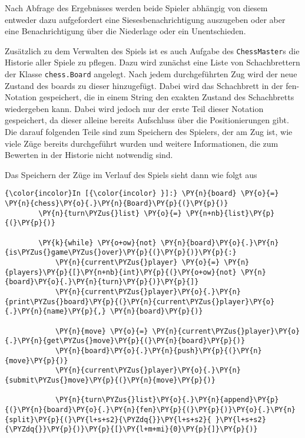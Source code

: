 Nach Abfrage des Ergebnisses werden beide Spieler abhängig von diesem
entweder dazu aufgefordert eine Siesesbenachrichtigung auszugeben oder
aber eine Benachrichtigung über die Niederlage oder ein Unentschieden.

Zusätzlich zu dem Verwalten des Spiels ist es auch Aufgabe des
\texttt{ChessMaster}s die Historie aller Spiele zu pflegen. Dazu wird
zunächst eine Liste von Schachbrettern der Klasse \texttt{chess.Board}
angelegt. Nach jedem durchgeführten Zug wird der neue Zustand des boards
zu dieser hinzugefügt. Dabei wird das Schachbrett in der fen-Notation
gespeichert, die in einem String den exakten Zustand des Schachbretts
wiedergeben kann. Dabei wird jedoch nur der erste Teil dieser Notation
gespeichert, da dieser alleine bereits Aufschluss über die
Positionierungen gibt. Die darauf folgenden Teile sind zum Speichern des
Spielers, der am Zug ist, wie viele Züge bereits durchgeführt wurden und
weitere Informationen, die zum Bewerten in der Historie nicht notwendig
sind.

Das Speichern der Züge im Verlauf des Spiels sieht dann wie folgt aus

    \begin{Verbatim}[commandchars=\\\{\}]
{\color{incolor}In [{\color{incolor} }]:} \PY{n}{board} \PY{o}{=} \PY{n}{chess}\PY{o}{.}\PY{n}{Board}\PY{p}{(}\PY{p}{)}
        \PY{n}{turn\PYZus{}list} \PY{o}{=} \PY{n+nb}{list}\PY{p}{(}\PY{p}{)}
        
        \PY{k}{while} \PY{o+ow}{not} \PY{n}{board}\PY{o}{.}\PY{n}{is\PYZus{}game\PYZus{}over}\PY{p}{(}\PY{p}{)}\PY{p}{:}
            \PY{n}{current\PYZus{}player} \PY{o}{=} \PY{n}{players}\PY{p}{[}\PY{n+nb}{int}\PY{p}{(}\PY{o+ow}{not} \PY{n}{board}\PY{o}{.}\PY{n}{turn}\PY{p}{)}\PY{p}{]}
            \PY{n}{current\PYZus{}player}\PY{o}{.}\PY{n}{print\PYZus{}board}\PY{p}{(}\PY{n}{current\PYZus{}player}\PY{o}{.}\PY{n}{name}\PY{p}{,} \PY{n}{board}\PY{p}{)}
        
            \PY{n}{move} \PY{o}{=} \PY{n}{current\PYZus{}player}\PY{o}{.}\PY{n}{get\PYZus{}move}\PY{p}{(}\PY{n}{board}\PY{p}{)}
            \PY{n}{board}\PY{o}{.}\PY{n}{push}\PY{p}{(}\PY{n}{move}\PY{p}{)}
            \PY{n}{current\PYZus{}player}\PY{o}{.}\PY{n}{submit\PYZus{}move}\PY{p}{(}\PY{n}{move}\PY{p}{)}
            
            \PY{n}{turn\PYZus{}list}\PY{o}{.}\PY{n}{append}\PY{p}{(}\PY{n}{board}\PY{o}{.}\PY{n}{fen}\PY{p}{(}\PY{p}{)}\PY{o}{.}\PY{n}{split}\PY{p}{(}\PY{l+s+s2}{\PYZdq{}}\PY{l+s+s2}{ }\PY{l+s+s2}{\PYZdq{}}\PY{p}{)}\PY{p}{[}\PY{l+m+mi}{0}\PY{p}{]}\PY{p}{)}
\end{Verbatim}

